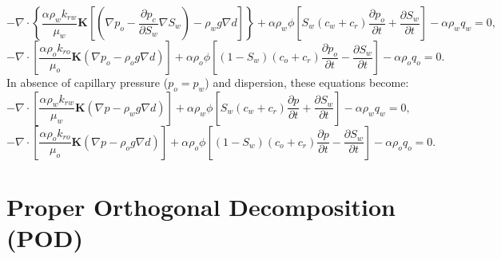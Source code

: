 \documentclass[12pt]{report}
\begin{document}
\begin{equation*}
 -\nabla \cdot \left\{ \frac{\alpha \rho_wk_{rw}}{\mu_w} \mathbf{K}\left[ \left( \nabla p_o-\frac{\partial p_c}{\partial S_w}\nabla S_w\right)-\rho_w g \nabla d\right]\right\} 
 +\alpha\rho_w\phi\left[S_w(c_w+c_r) \frac{\partial p_o}{\partial t}+\frac{\partial S_w}{\partial t}\right]
 -\alpha \rho_w q_w=0,
\end{equation*}
\begin{equation*}
- \nabla \cdot \left[\frac{\alpha \rho_ok_{ro}}{\mu_o} \mathbf{K}(\nabla p_o-\rho_o g \nabla d)\right]+\alpha \rho_o\phi \left[(1-S_w)(c_o+c_r)\frac{\partial p_o}{\partial t}-\frac{\partial S_w}{\partial t}\right]-\alpha \rho_o q_o=0.
\end{equation*}
In absence of capillary pressure ($p_o=p_w$) and dispersion, these equations become:
\begin{equation*}
 -\nabla \cdot \left[ \frac{\alpha \rho_wk_{rw}}{\mu_w} \mathbf{K} \left( \nabla p-\rho_w g \nabla d\right)\right]
 +\alpha\rho_w\phi\left[S_w(c_w+c_r) \frac{\partial p}{\partial t}+\frac{\partial S_w}{\partial t}\right]
 -\alpha \rho_w q_w=0,
\end{equation*}
\begin{equation*}
- \nabla \cdot \left[\frac{\alpha \rho_ok_{ro}}{\mu_o} \mathbf{K}(\nabla p-\rho_o g \nabla d)\right]+\alpha \rho_o\phi \left[(1-S_w)(c_o+c_r)\frac{\partial p}{\partial t}-\frac{\partial S_w}{\partial t}\right]-\alpha \rho_o q_o=0.
\end{equation*}


\chapter{Proper Orthogonal Decomposition (POD)}
\end{document}

